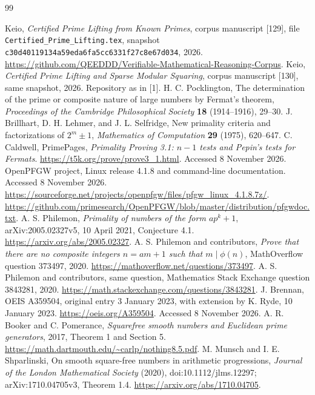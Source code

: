 \documentclass[11pt,a4paper]{article}
\theoremstyle{definition}\newtheorem{definition}[theorem]{Definition}
\theoremstyle{remark}\newtheorem{remark}[theorem]{Remark}
\begin{document}
\clearpage
\begin{thebibliography}{99}\small\raggedright
{} Keio,
\emph{Certified Prime Lifting from Known Primes}, corpus manuscript [129],
file \texttt{Certified\_Prime\_Lifting.tex}, snapshot
\texttt{c30d40119134a59eda6fa5cc6331f27c8e67d034}, 2026.
\url{https://github.com/QEEDDD/Verifiable-Mathematical-Reasoning-Corpus}.
 Keio,
\emph{Certified Prime Lifting and Sparse Modular Squaring}, corpus
manuscript [130], same snapshot, 2026. Repository as in [1].
 H. C. Pocklington,
The determination of the prime or composite nature of large numbers by
Fermat's theorem, \emph{Proceedings of the Cambridge Philosophical Society}
\textbf{18} (1914--1916), 29--30.
 J. Brillhart, D. H. Lehmer, and J. L. Selfridge,
New primality criteria and factorizations of $2^m\pm1$,
\emph{Mathematics of Computation} \textbf{29} (1975), 620--647.
 C. Caldwell, PrimePages,
\emph{Primality Proving 3.1: $n-1$ tests and Pepin's tests for Fermats}.
\url{https://t5k.org/prove/prove3_1.html}. Accessed 8 November 2026.
 OpenPFGW project, Linux release 4.1.8 and command-line
documentation. Accessed 8 November 2026.
\url{https://sourceforge.net/projects/openpfgw/files/pfgw_linux_4.1.8.7z/}.
\url{https://github.com/primesearch/OpenPFGW/blob/master/distribution/pfgwdoc.txt}.
 A. S. Philemon,
\emph{Primality of numbers of the form $ap^k+1$},
arXiv:2005.02327v5, 10 April 2021, Conjecture 4.1.
\url{https://arxiv.org/abs/2005.02327}.
 A. S. Philemon and contributors,
\emph{Prove that there are no composite integers $n=am+1$ such that
$m\mid\phi(n)$}, MathOverflow question 373497, 2020.
\url{https://mathoverflow.net/questions/373497}.
 A. S. Philemon and contributors,
same question, Mathematics Stack Exchange question 3843281, 2020.
\url{https://math.stackexchange.com/questions/3843281}.
 J. Brennan, OEIS A359504, original entry
3 January 2023, with extension by K. Ryde, 10 January 2023.
\url{https://oeis.org/A359504}. Accessed 8 November 2026.
 A. R. Booker and C. Pomerance,
\emph{Squarefree smooth numbers and Euclidean prime generators}, 2017,
Theorem 1 and Section 5.
\url{https://math.dartmouth.edu/~carlp/nothing8.5.pdf}.
 M. Munsch and I. E. Shparlinski,
On smooth square-free numbers in arithmetic progressions,
\emph{Journal of the London Mathematical Society} (2020),
doi:10.1112/jlms.12297; arXiv:1710.04705v3, Theorem 1.4.
\url{https://arxiv.org/abs/1710.04705}.
\end{thebibliography}
\end{document}
